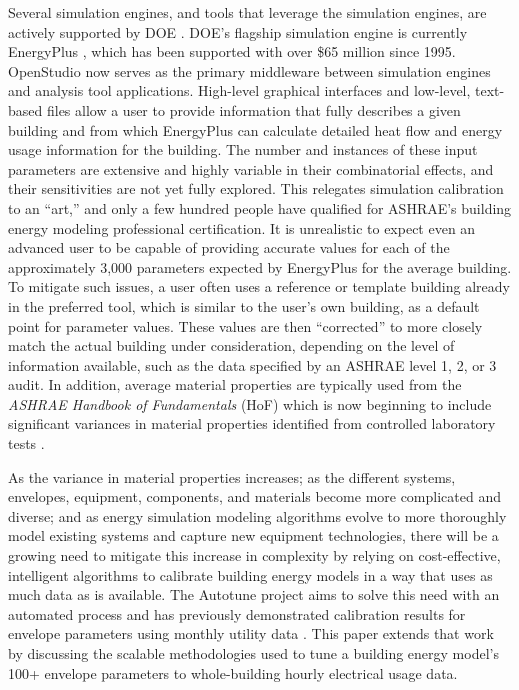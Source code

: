 \documentclass[preprint, review, 12pt]{elsarticle}
\begin{document}
Several simulation engines, and tools that leverage the simulation engines, are actively supported by DOE \cite{cit:doetools2012}. DOE’s flagship simulation engine is currently EnergyPlus \cite{cit:energyplus}, which has been supported with over \$65 million since 1995. OpenStudio \cite{cit:nrel2012} now serves as the primary middleware between simulation engines and analysis tool applications. High-level graphical interfaces and low-level, text-based files allow a user to provide information that fully describes a given building and from which EnergyPlus can calculate detailed heat flow and energy usage information for the building. The number and instances of these input parameters are extensive and highly variable in their combinatorial effects, and their sensitivities are not yet fully explored. This relegates simulation calibration to an ``art,'' and only a few hundred people have qualified for ASHRAE's building energy modeling professional certification. It is unrealistic to expect even an advanced user to be capable of providing accurate values for each of the approximately 3,000 parameters expected by EnergyPlus for the average building. To mitigate such issues, a user often uses a reference or template building already in the preferred tool, which is similar to the user's own building, as a default point for parameter values. These values are then ``corrected'' to more closely match the actual building under consideration, depending on the level of information available, such as the data specified by an ASHRAE level 1, 2, or 3 audit. In addition, average material properties are typically used from the \textit{ASHRAE Handbook of Fundamentals} (HoF) which is now beginning to include significant variances in material properties identified from controlled laboratory tests \cite{cit:ashrae2013}.

As the variance in material properties increases; as the different systems, envelopes, equipment, components, and materials become more complicated and diverse; and as energy simulation modeling algorithms evolve to more thoroughly model existing systems and capture new equipment technologies, there will be a growing need to mitigate this increase in complexity by relying on cost-effective, intelligent algorithms to calibrate building energy models in a way that uses as much data as is available. The Autotune project \cite{cit:new2012} aims to solve this need with an automated process and has previously demonstrated calibration results for envelope parameters using monthly utility data \cite{cit:garrett2013}. This paper extends that work by discussing the scalable methodologies used to tune a building energy model's 100+ envelope parameters to whole-building hourly electrical usage data.
\end{document}
